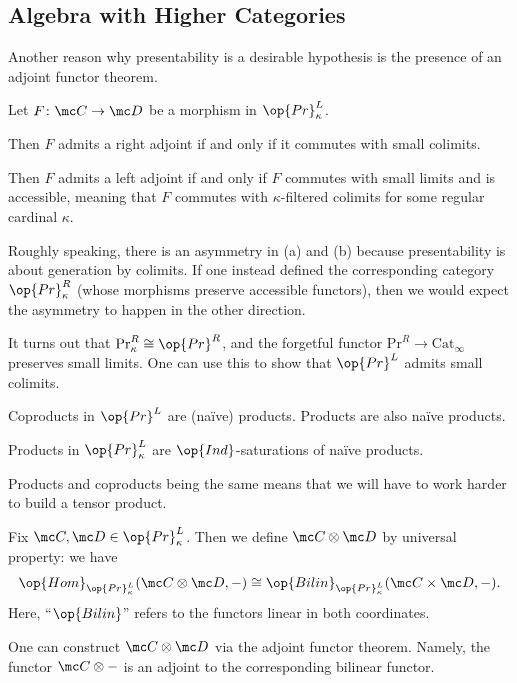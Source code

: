 \documentclass[../notes.tex]{subfiles}
\begin{document}
\subsection{Algebra with Higher Categories}
Another reason why presentability is a desirable hypothesis is the presence of an adjoint functor theorem.
\begin{theorem}[Lurie]
	Let $F\colon\mc C\to\mc D$ be a morphism in $\op{Pr}^L_\kappa$.
	\begin{listalph}
		\item Then $F$ admits a right adjoint if and only if it commutes with small colimits.
		\item Then $F$ admits a left adjoint if and only if $F$ commutes with small limits and is accessible, meaning that $F$ commutes with $\kappa$-filtered colimits for some regular cardinal $\kappa$.
	\end{listalph}
\end{theorem}
\begin{remark}
	Roughly speaking, there is an asymmetry in (a) and (b) because presentability is about generation by colimits. If one instead defined the corresponding category $\op{Pr}^R_\kappa$ (whose morphisms preserve accessible functors), then we would expect the asymmetry to happen in the other direction.
\end{remark}
\begin{remark}
	It turns out that $\mathrm{Pr}^R_\kappa\cong\op{Pr}^R$, and the forgetful functor $\mathrm{Pr}^R\to\mathrm{Cat}_\infty$ preserves small limits. One can use this to show that $\op{Pr}^L$ admits small colimits.
\end{remark}
\begin{example}
	Coproducts in $\op{Pr}^L$ are (na\"ive) products. Products are also na\"ive products. 
\end{example}
\begin{example}
	Products in $\op{Pr}^L_\kappa$ are $\op{Ind}$-saturations of na\"ive products.
\end{example}
Products and coproducts being the same means that we will have to work harder to build a tensor product.
\begin{definition}
	Fix $\mc C,\mc D\in\op{Pr}^L_\kappa$. Then we define $\mc C\otimes\mc D$ by universal property: we have
	\[\op{Hom}_{\op{Pr}^L_\kappa}(\mc C\otimes\mc D,-)\cong\op{Bilin}_{\op{Pr}^L_\kappa}(\mc C\times\mc D,-).\]
	Here, ``$\op{Bilin}$'' refers to the functors linear in both coordinates.
\end{definition}
\begin{remark}
	One can construct $\mc C\otimes\mc D$ via the adjoint functor theorem. Namely, the functor $\mc C\otimes-$ is an adjoint to the corresponding bilinear functor.
\end{remark}
\end{document}

